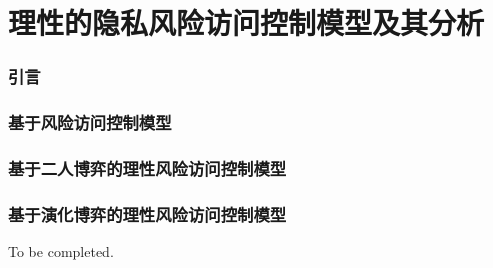 \chapter{理性的隐私风险访问控制模型及其分析}
\label{chap:game-theoretical-RaBAC-for-privacy}

\subsection{引言}

\subsection{基于风险访问控制模型}

\subsection{基于二人博弈的理性风险访问控制模型}

\subsection{基于演化博弈的理性风险访问控制模型}



To be completed.